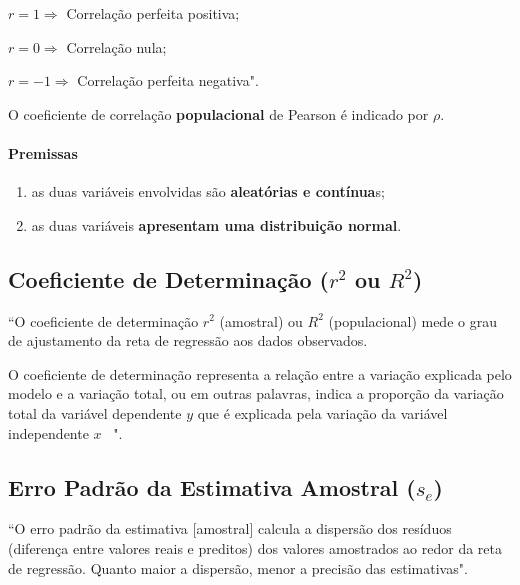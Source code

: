 		$ r = 1 \Rightarrow $ Correlação perfeita positiva;
		
		$ r = 0 \Rightarrow $ Correlação nula;
		
		$ r = -1 \Rightarrow $ Correlação perfeita negativa". \cite{torres}
		
		\bigskip
		
		O coeficiente de correlação \textbf{populacional} de Pearson é indicado por \textbf{$ \rho $}.
		
		\paragraph{Premissas \cite{torres}}
		
			\begin{enumerate}[label=(\alph*)]
		
				\item as duas variáveis envolvidas são \textbf{aleatórias e contínua}s;
				
				\item as duas variáveis \textbf{apresentam uma distribuição normal}.			
			
			\end{enumerate}
			
	\subsection{Coeficiente de Determinação ($ r^{2} $ ou $ R^{2} $)}
			
		``O coeficiente de determinação \textbf{$ r^{2} $} (amostral) ou \textbf{$ R^{2} $} (populacional) mede o grau de ajustamento da reta de regressão aos dados observados.

		\bigskip
		
		O coeficiente de determinação representa a relação entre a variação explicada pelo modelo e a variação total, ou em outras palavras, indica a proporção da variação total da variável dependente $ y $ que é explicada pela variação da variável independente $ x $ \ ". \cite{torres}
			
	\subsection{Erro Padrão da Estimativa Amostral ($ s_{e} $)}
			
		``O erro padrão da estimativa [amostral] calcula a dispersão dos resíduos (diferença entre valores reais e preditos) dos valores amostrados ao redor da reta de regressão. Quanto maior a dispersão, menor a precisão das estimativas". \cite{torres}
			
